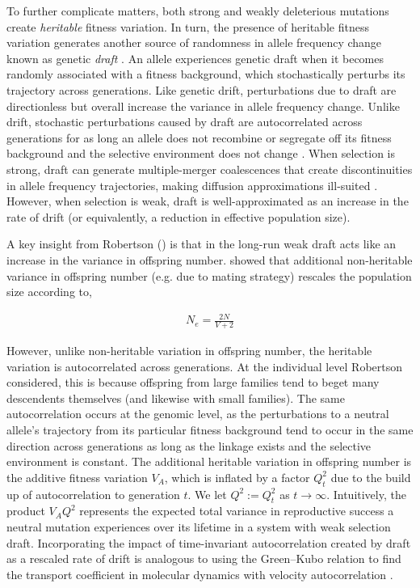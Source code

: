 \documentclass[11pt]{article}
\begin{document}
To further complicate matters, both strong and weakly deleterious mutations
create \emph{heritable} fitness variation. In turn, the presence of heritable
fitness variation generates another source of randomness in allele frequency
change known as genetic \emph{draft} \parencite{Neher2013-dz}. An allele
experiences genetic draft when it becomes randomly associated with a fitness
background, which stochastically perturbs its trajectory across generations.
Like genetic drift, perturbations due to draft are directionless but overall
increase the variance in allele frequency change. Unlike drift, stochastic
perturbations caused by draft are autocorrelated across generations for as long
an allele does not recombine or segregate off its fitness background and the
selective environment does not change
\parencite{Robertson1961-ho,Santiago1995-hx,Buffalo2019-qs}. When selection is
strong, draft can generate multiple-merger coalescences that create
discontinuities in allele frequency trajectories, making diffusion
approximations ill-suited \parencite{Gillespie2000-mh,Der2011-it,Neher2013-dz}.
However, when selection is weak, draft is well-approximated as an increase in
the rate of drift (or equivalently, a reduction in effective population size).

A key insight from Robertson (\citeyear{Robertson1961-ho}) is that in the
long-run weak draft acts like an increase in the variance in offspring number.
\textcite{Wright1938-tv} showed that additional non-heritable variance in
offspring number (e.g. due to mating strategy) rescales the population size
according to,

\begin{align}
    \label{eq:simple_Ne}
    N_e = \frac{2N}{V + 2}
\end{align}

However, unlike non-heritable variation in offspring number, the heritable
variation is autocorrelated across generations. At the individual level
Robertson considered, this is because offspring from large families tend to
beget many descendents themselves (and likewise with small families). The same
autocorrelation occurs at the genomic level, as the perturbations to a neutral
allele's trajectory from its particular fitness background tend to occur in the
same direction across generations as long as the linkage exists and the
selective environment is constant. The additional heritable variation in
offspring number is the additive fitness variation $V_A$, which is inflated by
a factor $Q_t^2$ due to the build up of autocorrelation to generation $t$. We
let $Q^2 := Q_t^2$ as $t \to \infty$. Intuitively, the product $V_A Q^2$
represents the expected total variance in reproductive success a neutral
mutation experiences over its lifetime in a system with weak selection draft.
Incorporating the impact of time-invariant autocorrelation created by draft as
a rescaled rate of drift is analogous to using the Green--Kubo relation to find
the transport coefficient in molecular dynamics with velocity autocorrelation
\parencite{Green1954-kl,Kubo1957-va}.
\end{document}
